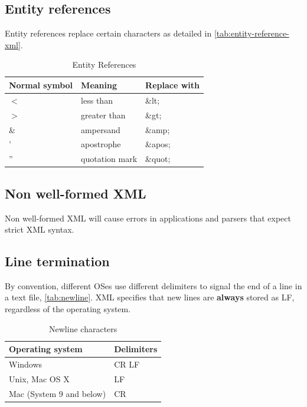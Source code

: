 \documentclass{pgnotes}
\newcommand{\entityref}[1]{\&#1;}
\begin{document}
\subsection{Entity references}

Entity references replace certain characters as detailed in \autoref{tab:entity-reference-xml}.

\begin{table}[htbp]
  \centering
  \begin{tabular}{l l l}
    \toprule
    \textbf{Normal symbol} & \textbf{Meaning} & \textbf{Replace with} \\
    \midrule
    $<$ & less than & \entityref{lt} \\
    $>$ & greater than & \entityref{gt} \\
    \& & ampersand & \entityref{amp} \\
    ' & apostrophe & \entityref{apos} \\
    '' & quotation mark & \entityref{quot} \\
    \bottomrule
  \end{tabular}
  \caption{Entity References}
  \label{tab:entity-reference-xml}
\end{table}


\subsection{Non well-formed XML}

Non well-formed XML will cause errors in applications and parsers that expect strict XML syntax.

\subsection{Line termination}

By convention, different OSes use different delimiters to signal the end of a line in a text file, \autoref{tab:newline}.
XML specifies that new lines are \textbf{always} stored as LF, regardless of the operating system. 

\begin{table}[htbp]
  \centering
  \begin{tabular}{l l}
    \toprule
    \textbf{Operating system} & \textbf{Delimiters} \\
    \midrule
    Windows & CR LF \\
    Unix, Mac OS X & LF \\
    Mac (System 9 and below) & CR \\ 
    \bottomrule
  \end{tabular}
  \caption{Newline characters}
  \label{tab:newline}
\end{table}
\end{document}
